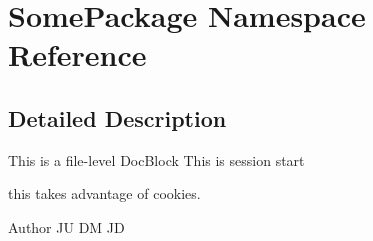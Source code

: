 \hypertarget{namespace_some_package}{}\section{Some\+Package Namespace Reference}
\label{namespace_some_package}


\subsection{Detailed Description}
This is a file-\/level Doc\+Block This is session start

this takes advantage of cookies.

\begin{DoxyAuthor}{Author}
JU DM JD 
\end{DoxyAuthor}
